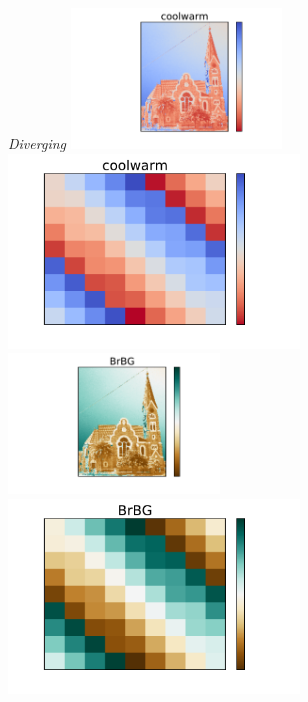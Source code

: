 \documentclass{beamer}
\begin{document}
\begin{frame}
\begin{columns}
\begin{column}{0.5\textwidth}
\begin{center}
\textit{Diverging}
\vfill
\includegraphics[width=0.42\textwidth]{../church_coolwarm.pdf}
\includegraphics[width=0.58\textwidth]{../magicsquare_coolwarm.pdf}\newline\newline
\vfill
\includegraphics[width=0.42\textwidth]{../church_BrBG.pdf}
\includegraphics[width=0.58\textwidth]{../magicsquare_BrBG.pdf}
\vfill
\end{center}
\end{column}
\end{columns}
\end{frame}
\end{document}
